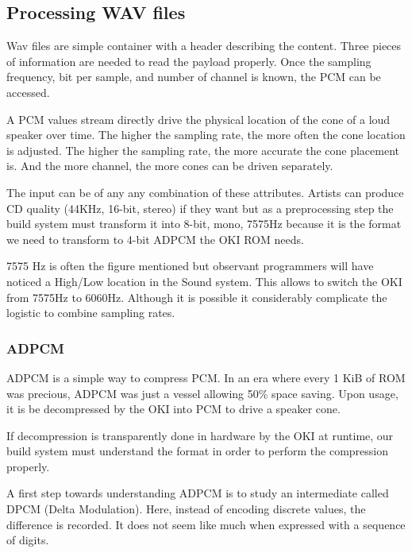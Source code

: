 \subsection{Processing WAV files}
Wav files are simple container with a header describing the content. Three pieces of information are needed to read the payload properly. Once the sampling frequency, bit per sample, and number of channel is known, the PCM can be accessed.

A PCM values stream directly drive the physical location of the cone of a loud speaker over time. The higher the sampling rate, the more often the cone location is adjusted. The higher the sampling rate, the more accurate the cone placement is. And the more channel, the more cones can be driven separately.

The input can be of any any combination of these attributes. Artists can produce CD quality (44KHz, 16-bit, stereo) if they want but as a preprocessing step the build system must transform it into 8-bit, mono, 7575Hz because it is the format we need to transform to 4-bit ADPCM the OKI ROM needs.

\begin{trivia}
7575 Hz is often the figure mentioned but observant programmers will have noticed a High/Low  location in the Sound system. This allows to switch the OKI from 7575Hz to 6060Hz. Although it is possible it considerably complicate the logistic to combine sampling rates. 
\end{trivia}

\subsubsection{ADPCM}
ADPCM is a simple way to compress PCM. In an era where every 1 KiB of ROM was precious, ADPCM was just a vessel allowing 50\% space saving. Upon usage, it is be decompressed by the OKI into PCM to drive a speaker cone.
 
 

If decompression is transparently done in hardware by the OKI at runtime, our build system must understand the format in order to perform the compression properly. 

A first step towards understanding ADPCM is to study an intermediate called DPCM (Delta Modulation). Here, instead of encoding discrete values, the difference is recorded. It does not seem like much when expressed with a sequence of digits.



